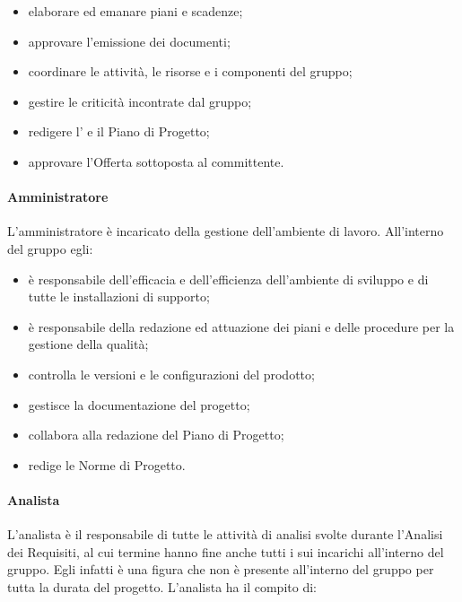 			\begin{itemize}
				\item elaborare ed emanare piani e scadenze;
				\item approvare l'emissione dei documenti;
				\item coordinare le attività, le risorse e i componenti del gruppo;
				\item gestire le criticità incontrate dal gruppo;
				\item redigere l' e il Piano di Progetto;
				\item approvare l'Offerta sottoposta al committente.
			\end{itemize}

		\paragraph{Amministratore}

			L'amministratore è incaricato della gestione dell'ambiente di lavoro.
			\newline
			All'interno del gruppo egli:

			\begin{itemize}
				\item è responsabile dell'efficacia e dell'efficienza dell'ambiente di sviluppo e di tutte le installazioni di supporto;
				\item è responsabile della redazione ed attuazione dei piani e delle procedure per la gestione della qualità;
				\item controlla le versioni e le configurazioni del prodotto;
				\item gestisce la documentazione del progetto;
				\item collabora alla redazione del Piano di Progetto;
				\item redige le Norme di Progetto.
			\end{itemize}

		\paragraph{Analista}
			L'analista è il responsabile di tutte le attività di analisi svolte durante l'Analisi dei Requisiti, al cui termine hanno fine anche tutti i sui incarichi all'interno del gruppo. Egli infatti è una figura che non è presente all'interno del gruppo per tutta la durata del progetto.
			\newline
			L'analista ha il compito di:

